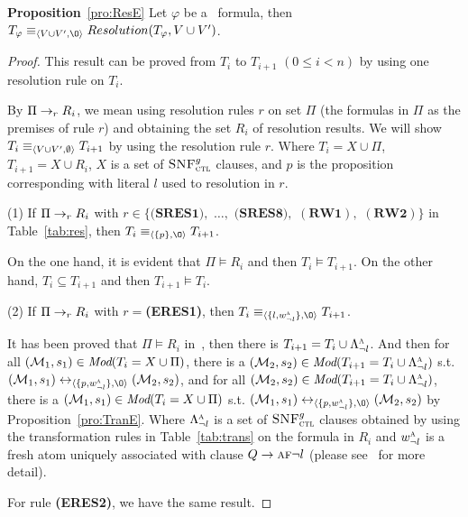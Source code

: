 \documentclass[twoside,11pt]{article}
\begin{document}
	\noindent\textbf{Proposition}~\ref{pro:ResE}
	Let $\varphi$ be a \CTL\ formula,
	then $T_{\varphi} \equiv_{\tuple{V \cup V', {\O}}} Resolution(T_{\varphi}, V \cup V')$.
	\\
	\begin{proof}
		This result can be proved from $T_i$ to $T_{i+1}$ $(0\leq i < n)$ by using one resolution rule on $T_i$.
		
		
		By $\Pi \rightarrow_r R_i$, we mean using resolution rules $r$ on set $\Pi$ (the formulas in $\Pi$ as the premises of rule $r$) and obtaining the set $R_i$ of resolution results.
		We will show $T_i \equiv_{{\langle{V\cup V', \emptyset}\rangle}} T_{i+1}$ by using the resolution rule $r$. Where $T_i= X \cup \Pi$, $T_{i+1}=X \cup R_i$, $X$ is a set of ${\textsc{SNF}_{\textsc{ctl}}^g}$ clauses, and $p$ is the proposition corresponding with literal $l$ used to resolution in $r$.
		
		(1) If $\Pi \rightarrow_r R_i$ with  $r\in \{\textbf{(SRES1)},$ $\dots,$ $\textbf{(SRES8)},$ $(\textbf{RW1}),$ $(\textbf{RW2})\}$ in Table~\ref{tab:res}, then $T_i \equiv_{\tuple{\{p\}, {\O}}} T_{i+1}$.
		
		
		On the one hand, it is evident that $\Pi \models R_i$ and then $T_i \models T_{i+1}$. On the other hand, $T_i\subseteq T_{i+1}$ and then $T_{i+1} \models T_i$.
		
		(2) If $\Pi \rightarrow_r R_i$ with $r=$\textbf{(ERES1)},
		then $T_i \equiv_{\tuple{\{l, w_{\neg l}^{\ALL}\}, {\O}}} T_{i+1}$.
		
		It has been proved that $\Pi \models R_i$ in~\cite{bolotov2000clausal}, then there is $T_{i+1}=T_i \cup \Lambda_{\neg l}^{\textsc{a}}$. And then for all $({\cal M}_1,s_1) \in \textit{Mod}(T_i= X \cup \Pi)$, there is a $({\cal M}_2, s_2)\in \textit{Mod}(T_{i+1}=T_i \cup \Lambda_{\neg l}^{\textsc{a}})$ s.t. $(\Hm_1, s_1) \lrto_{\tuple{\{p, w_{\neg l}^{\ALL}\}, {\O}}} (\Hm_2, s_2)$, and for all $({\cal M}_2, s_2)\in \textit{Mod}(T_{i+1}=T_i \cup \Lambda_{\neg l}^{\textsc{a}})$, there is a $({\cal M}_1,s_1) \in \textit{Mod}(T_i= X \cup \Pi)$ s.t. $(\Hm_1, s_1) \lrto_{\tuple{\{p, w_{\neg l}^{\ALL}\}, {\O}}} (\Hm_2, s_2)$ by Proposition~\ref{pro:TranE}. Where $\Lambda_{\neg l}^{\textsc{a}}$ is a set of ${\textsc{SNF}_{\textsc{ctl}}^g}$ clauses obtained by using the transformation rules in Table~\ref{tab:trans} on the formula in $R_i$ and $w_{\neg l}^{\textsc{a}}$ is a fresh atom uniquely associated with clause $Q \rightarrow \textsc{a} \textsc{f} \neg l$ (please see~\cite{zhang2009refined} for more detail).
		
		For rule \textbf{(ERES2)}, we have the same result.
		
	\end{proof}
	
\end{document}
